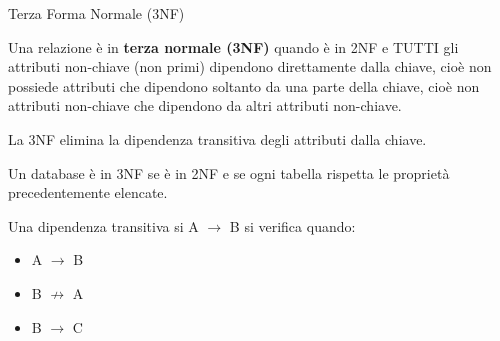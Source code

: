 \begin{frame}{Terza Forma Normale (3NF)}
\vspace{-1.5cm}
\begin{minipage}{0.9\textwidth}
Una relazione \`e in \textbf{terza normale (3NF)} quando \`e in 2NF e TUTTI gli attributi non-chiave (non primi) dipendono direttamente dalla chiave, cio\`e non possiede attributi che dipendono soltanto da una parte della chiave, cio\`e non attributi non-chiave che dipendono da altri attributi non-chiave.
\end{minipage}
\pause

\vspace{.2cm}
La 3NF elimina la dipendenza transitiva degli attributi dalla chiave.

\begin{minipage}{0.7\textwidth}
\vspace{.2cm}
Un database \`e in 3NF se \`e in 2NF e se ogni tabella rispetta le propriet\`a precedentemente elencate.

Una dipendenza transitiva si A $ \rightarrow $ B si verifica quando:
\begin{itemize}
    \item A $ \rightarrow $ B
    \item B $ \not\to $ A
    \item B $ \rightarrow $ C
\end{itemize}
\end{minipage}
\end{frame}
%
